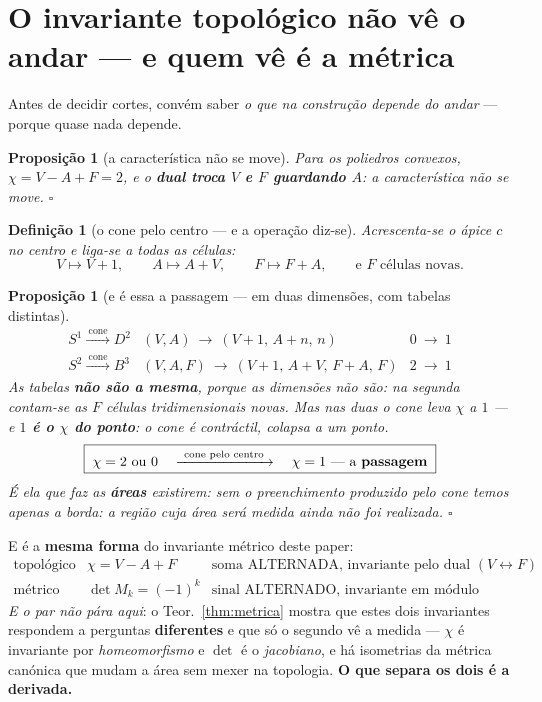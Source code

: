 \documentclass[11pt,a4paper]{article}
\newtheorem{proposicao}[teorema]{Proposição}
\newtheorem{definicao}{Definição}
\begin{document}
\section{O invariante topológico não vê o andar --- e quem vê é a
métrica}\label{sec:euler}

Antes de decidir cortes, convém saber \emph{o que na construção depende do andar} ---
porque quase nada depende.

\begin{proposicao}[a característica não se move]\label{prop:euler}
Para os poliedros convexos, $\chi=V-A+F=2$, e o \textbf{dual troca $V$ e $F$
guardando $A$}: a característica não se move. $\square$
\end{proposicao}

\begin{definicao}[o cone pelo centro --- e a operação diz-se]\label{def:cone-centro}
Acrescenta-se o ápice $c$ no centro e liga-se a todas as células:
\[
V\mapsto V+1,\qquad A\mapsto A+V,\qquad F\mapsto F+A,
\qquad\text{e } F \text{ células novas.}
\]
\end{definicao}

\begin{proposicao}[e é essa a passagem --- em duas dimensões, com tabelas
distintas]\label{prop:passagem}
\[
\boxed{
\begin{array}{lll}
S^{1}\xrightarrow{\ \text{cone}\ }D^{2}
 & (V,A)\ \to\ (V{+}1,\,A{+}n,\,n)
 & 0\ \longrightarrow\ 1\\[3pt]
S^{2}\xrightarrow{\ \text{cone}\ }B^{3}
 & (V,A,F)\ \to\ (V{+}1,\,A{+}V,\,F{+}A,\,F)
 & 2\ \longrightarrow\ 1
\end{array}}
\]
As tabelas \textbf{não são a mesma}, porque as dimensões não são: na segunda
contam-se as $F$ células tridimensionais novas. Mas nas duas o cone leva $\chi$ a
$1$ --- e \textbf{$1$ é o $\chi$ do ponto}: o cone é contráctil, colapsa a
\emph{um} ponto.
\[
\boxed{\;\chi=2\ \text{ou}\ 0 \quad\xrightarrow{\ \text{cone pelo centro}\ }\quad
\chi=1\ \text{---\ a \textbf{passagem}}\;}
\]
É ela que faz as \textbf{áreas} existirem: sem o preenchimento produzido pelo cone temos
apenas a borda: a região cuja área será medida ainda não foi realizada. $\square$
\end{proposicao}

\noindent E é a \textbf{mesma forma} do invariante métrico deste paper:
\[
\boxed{
\begin{array}{lll}
\text{topológico} & \chi=V-A+F & \text{soma ALTERNADA, invariante pelo dual }(V\leftrightarrow F)\\[2pt]
\text{métrico} & \det M_k=(-1)^{k} & \text{sinal ALTERNADO, invariante em módulo pelo passo}
\end{array}}
\]
\emph{E o par não pára aqui}: o Teor.~\ref{thm:metrica} mostra que estes dois invariantes
respondem a perguntas \textbf{diferentes} e que só o segundo vê a medida --- $\chi$ é
invariante por \emph{homeomorfismo} e $\det$ é o \emph{jacobiano}, e há isometrias da
métrica canónica que mudam a área sem mexer na topologia. \textbf{O que separa os dois é a
derivada.}
\end{document}
